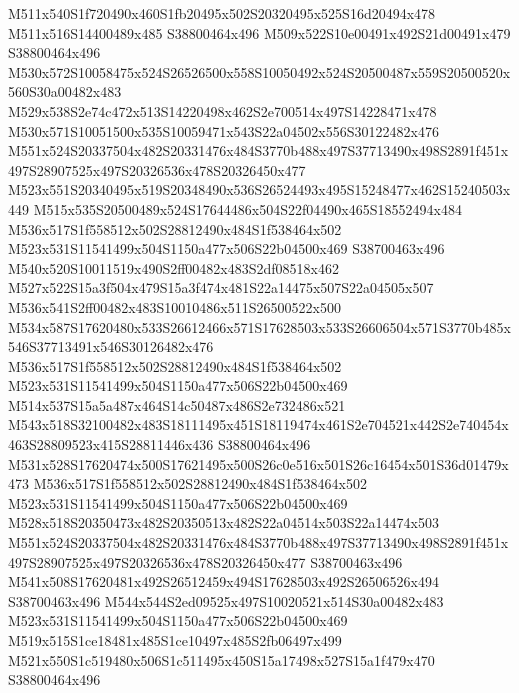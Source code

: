 \documentclass{article}
\begin{document}
\begin{multicols}{2}
M511x540S1f720490x460S1fb20495x502S20320495x525S16d20494x478 M511x516S14400489x485 S38800464x496 M509x522S10e00491x492S21d00491x479 S38800464x496 M530x572S10058475x524S26526500x558S10050492x524S20500487x559S20500520x560S30a00482x483 M529x538S2e74c472x513S14220498x462S2e700514x497S14228471x478 M530x571S10051500x535S10059471x543S22a04502x556S30122482x476 M551x524S20337504x482S20331476x484S3770b488x497S37713490x498S2891f451x497S28907525x497S20326536x478S20326450x477 M523x551S20340495x519S20348490x536S26524493x495S15248477x462S15240503x449 M515x535S20500489x524S17644486x504S22f04490x465S18552494x484 M536x517S1f558512x502S28812490x484S1f538464x502 M523x531S11541499x504S1150a477x506S22b04500x469 S38700463x496 M540x520S10011519x490S2ff00482x483S2df08518x462 M527x522S15a3f504x479S15a3f474x481S22a14475x507S22a04505x507 M536x541S2ff00482x483S10010486x511S26500522x500 M534x587S17620480x533S26612466x571S17628503x533S26606504x571S3770b485x546S37713491x546S30126482x476 M536x517S1f558512x502S28812490x484S1f538464x502 M523x531S11541499x504S1150a477x506S22b04500x469 M514x537S15a5a487x464S14c50487x486S2e732486x521 M543x518S32100482x483S18111495x451S18119474x461S2e704521x442S2e740454x463S28809523x415S28811446x436 S38800464x496 M531x528S17620474x500S17621495x500S26c0e516x501S26c16454x501S36d01479x473 M536x517S1f558512x502S28812490x484S1f538464x502 M523x531S11541499x504S1150a477x506S22b04500x469 M528x518S20350473x482S20350513x482S22a04514x503S22a14474x503 M551x524S20337504x482S20331476x484S3770b488x497S37713490x498S2891f451x497S28907525x497S20326536x478S20326450x477 S38700463x496 M541x508S17620481x492S26512459x494S17628503x492S26506526x494 S38700463x496 M544x544S2ed09525x497S10020521x514S30a00482x483 M523x531S11541499x504S1150a477x506S22b04500x469 M519x515S1ce18481x485S1ce10497x485S2fb06497x499 M521x550S1c519480x506S1c511495x450S15a17498x527S15a1f479x470 S38800464x496






\end{multicols}
\end{document}
